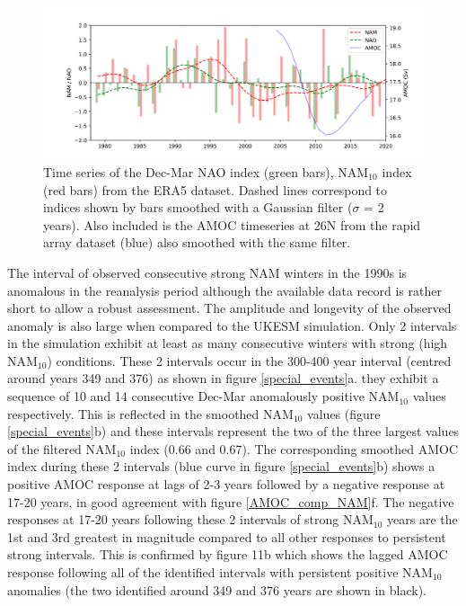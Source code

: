 \begin{figure}[h!]
\begin{center}
\noindent\includegraphics[width = 0.9\linewidth]{Figures/Figures-surface/ERA5_series_allf.png} \caption{Time series of the Dec-Mar NAO index (green bars), NAM$_{10}$ index (red bars) from the ERA5 dataset. Dashed lines correspond to indices shown by bars smoothed with a Gaussian filter ($\sigma$ = 2 years). Also included is the  AMOC timeseries at 26N from the rapid array dataset (blue) also smoothed with the same filter.}
\label{ERA5_series}
\end{center}
\end{figure}

The interval of observed consecutive strong NAM winters in the 1990s is anomalous in the reanalysis period although the available data record is rather short to allow a robust assessment. The amplitude and longevity of the observed anomaly is also large when compared to the UKESM simulation. Only 2 intervals in the simulation exhibit at least as many consecutive winters with strong (high NAM$_{10}$) conditions. These 2 intervals occur in the 300-400 year interval (centred around years 349 and 376) as shown in figure \ref{special_events}a. they exhibit a sequence of 10 and 14 consecutive Dec-Mar anomalously positive NAM$_{10}$ values respectively. This is reflected in the smoothed NAM$_{10}$ values (figure \ref{special_events}b) and these intervals represent the two of the three largest values of the filtered NAM$_{10}$ index (0.66 and 0.67). The corresponding smoothed AMOC index during these 2 intervals (blue curve in figure \ref{special_events}b) shows a positive AMOC response at lags of 2-3 years followed by a negative response at 17-20 years, in good agreement with figure \ref{AMOC_comp_NAM}f. The negative responses at 17-20 years following these 2 intervals of strong NAM$_{10}$ years are the 1st and 3rd greatest in magnitude compared to all other responses to persistent strong intervals. This is confirmed by figure 11b which shows the lagged AMOC response following all of the identified intervals with persistent positive NAM$_{10}$ anomalies (the two identified around 349 and 376 years are shown in black). 

